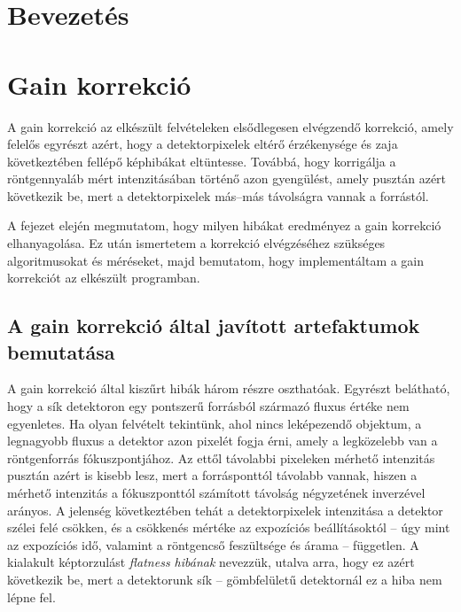 \documentclass[a4paper,12pt,twoside]{article}
\begin{document}
\hspace{9cm}




\clearpage


 \tableofcontents

\clearpage

	






\section{Bevezetés}

\section{Gain korrekció}


A gain korrekció az elkészült felvételeken elsődlegesen elvégzendő korrekció, amely felelős egyrészt azért, hogy a detektorpixelek eltérő érzékenysége és zaja következtében fellépő képhibákat eltüntesse. Továbbá, hogy korrigálja a röntgennyaláb mért intenzitásában történő azon gyengülést, amely pusztán azért következik be, mert a detektorpixelek más--más távolságra vannak a forrástól.

A fejezet elején megmutatom, hogy milyen hibákat eredményez a gain korrekció elhanyagolása. Ez után ismertetem a korrekció elvégzéséhez szükséges algoritmusokat és méréseket, majd bemutatom, hogy implementáltam a gain korrekciót az elkészült programban. 

\subsection{A gain korrekció által javított artefaktumok bemutatása}

A gain korrekció által kiszűrt hibák három részre oszthatóak. Egyrészt belátható, hogy a sík detektoron egy pontszerű forrásból származó fluxus értéke nem egyenletes. Ha olyan felvételt tekintünk, ahol nincs leképezendő objektum, a legnagyobb fluxus a detektor azon pixelét fogja érni, amely a legközelebb van a röntgenforrás fókuszpontjához. Az ettől távolabbi pixeleken mérhető intenzitás pusztán azért is kisebb lesz, mert a forrásponttól távolabb vannak, hiszen a mérhető intenzitás a fókuszponttól számított távolság négyzetének inverzével arányos. A jelenség következtében tehát a detektorpixelek intenzitása a detektor szélei felé csökken, és a csökkenés mértéke az expozíciós beállításoktól -- úgy mint az expozíciós idő, valamint a röntgencső feszültsége és árama -- független. A kialakult képtorzulást \emph{flatness hibának} nevezzük, utalva arra, hogy ez azért következik be, mert a detektorunk sík -- gömbfelületű detektornál ez a hiba nem lépne fel.
\end{document}

